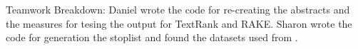 \documentclass[11pt,a4paper]{article}
\begin{document}
Teamwork Breakdown: Daniel wrote the code for re-creating the abstracts and the measures for tesing the output for TextRank and RAKE. Sharon wrote the code for generation the stoplist and found the datasets used from \citet{hulth-2003-improved}.
 

%
%




\end{document}
